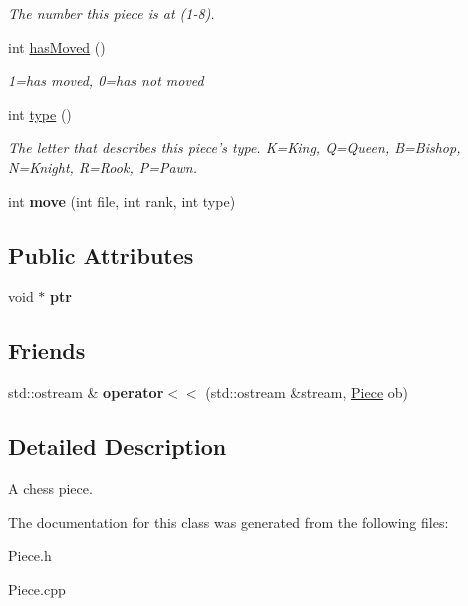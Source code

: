 \begin{DoxyCompactItemize}
\begin{DoxyCompactList}\small\item\em The number this piece is at (1-\/8). \item\end{DoxyCompactList}\item 
\hypertarget{classPiece_ac1b255f3267c459f418a45a7cd580af8}{
int \hyperlink{classPiece_ac1b255f3267c459f418a45a7cd580af8}{hasMoved} ()}
\label{classPiece_ac1b255f3267c459f418a45a7cd580af8}

\begin{DoxyCompactList}\small\item\em 1=has moved, 0=has not moved \item\end{DoxyCompactList}\item 
\hypertarget{classPiece_a342bcc878214b55d621b78ac8b2a50ab}{
int \hyperlink{classPiece_a342bcc878214b55d621b78ac8b2a50ab}{type} ()}
\label{classPiece_a342bcc878214b55d621b78ac8b2a50ab}

\begin{DoxyCompactList}\small\item\em The letter that describes this piece's type. K=King, Q=Queen, B=Bishop, N=Knight, R=Rook, P=Pawn. \item\end{DoxyCompactList}\item 
\hypertarget{classPiece_a4bd26bbbbaccbab5b554bffd216ba865}{
int {\bfseries move} (int file, int rank, int type)}
\label{classPiece_a4bd26bbbbaccbab5b554bffd216ba865}

\end{DoxyCompactItemize}
\subsection*{Public Attributes}
\begin{DoxyCompactItemize}
\item 
\hypertarget{classPiece_a609dfb34f65a8da07017f3246f8876bf}{
void $\ast$ {\bfseries ptr}}
\label{classPiece_a609dfb34f65a8da07017f3246f8876bf}

\end{DoxyCompactItemize}
\subsection*{Friends}
\begin{DoxyCompactItemize}
\item 
\hypertarget{classPiece_aeec19f074c6b0319987512d443968ca1}{
std::ostream \& {\bfseries operator$<$$<$} (std::ostream \&stream, \hyperlink{classPiece}{Piece} ob)}
\label{classPiece_aeec19f074c6b0319987512d443968ca1}

\end{DoxyCompactItemize}


\subsection{Detailed Description}
A chess piece. 

The documentation for this class was generated from the following files:\begin{DoxyCompactItemize}
\item 
Piece.h\item 
Piece.cpp\end{DoxyCompactItemize}
